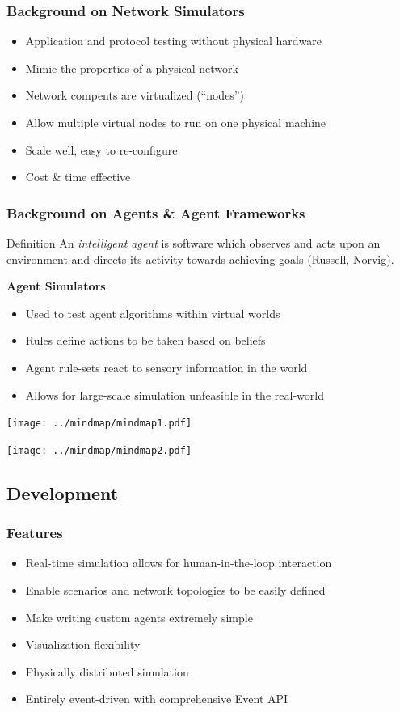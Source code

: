 \documentclass[mathserif,usenames,dvipsnames]{beamer}
\begin{document}
\frame
{
    \frametitle{Background on Network Simulators}
    \begin{itemize}
        \item Application and protocol testing without physical hardware
        \item Mimic the properties of a physical network
        \item Network compents are virtualized (``nodes'') 
        \item Allow multiple virtual nodes to run on one physical machine
        \item Scale well, easy to re-configure
        \item Cost \& time effective
    \end{itemize}
}

\frame
{
    \frametitle{Background on Agents \& Agent Frameworks}
    \begin{block}{Definition}
    An \emph{intelligent agent} is software which observes and acts upon an environment and directs its activity towards achieving goals (Russell, Norvig).
    \end{block}

    \textbf{Agent Simulators}
    \begin{itemize}
        \item Used to test agent algorithms within virtual worlds
        \item Rules define actions to be taken based on beliefs
        \item Agent rule-sets react to sensory information in the world
        \item Allows for large-scale simulation unfeasible in the real-world
    \end{itemize}
}

\frame
{
    \begin{center}
        \texttt{[image: ../mindmap/mindmap1.pdf]}
    \end{center}
}

\frame
{
    \begin{center}
        \texttt{[image: ../mindmap/mindmap2.pdf]}
    \end{center}
}
\subsection{Development}

\frame
{
    \frametitle{Features}
    \begin{itemize}
        \item Real-time simulation allows for human-in-the-loop interaction
        \item Enable scenarios and network topologies to be easily defined
        \item Make writing custom agents extremely simple
        \item Visualization flexibility
        \item Physically distributed simulation
        \item Entirely event-driven with comprehensive Event API
    \end{itemize}
}
\end{document}
